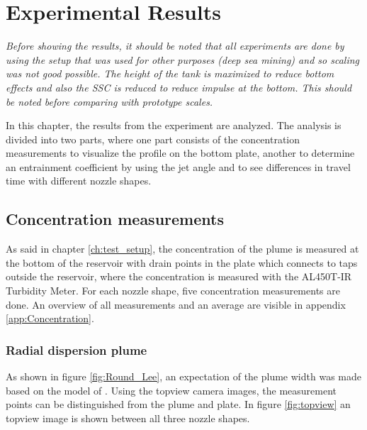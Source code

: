\chapter{Experimental Results}
\textit{Before showing the results, it should be noted that all experiments are done by using the setup that was used for other purposes (deep sea mining) and so scaling was not good possible. The height of the tank is maximized to reduce bottom effects and also the SSC is reduced to reduce impulse at the bottom. This should be noted before comparing with prototype scales.} \newline \newline

\noindent In this chapter, the results from the experiment are analyzed. The analysis is divided into two parts, where one part consists of the concentration measurements to visualize the profile on the bottom plate, another to determine an entrainment coefficient by using the jet angle and to see differences in travel time with different nozzle shapes.



\newpage
\section{Concentration measurements}
As said in chapter \ref{ch:test_setup}, the concentration of the plume is measured at the bottom of the reservoir with drain points in the plate which connects to taps outside the reservoir, where the concentration is measured with the AL450T-IR Turbidity Meter. For each nozzle shape, five concentration measurements are done. An overview of all measurements and an average are visible in appendix \ref{app:Concentration}.

\subsection{Radial dispersion plume}
As shown in figure \ref{fig:Round_Lee}, an expectation of the plume width was made based on the model of \cite{Lee+}. Using the topview camera images, the measurement points can be distinguished from the plume and plate. In figure \ref{fig:topview} an topview image is shown between all three nozzle shapes.

